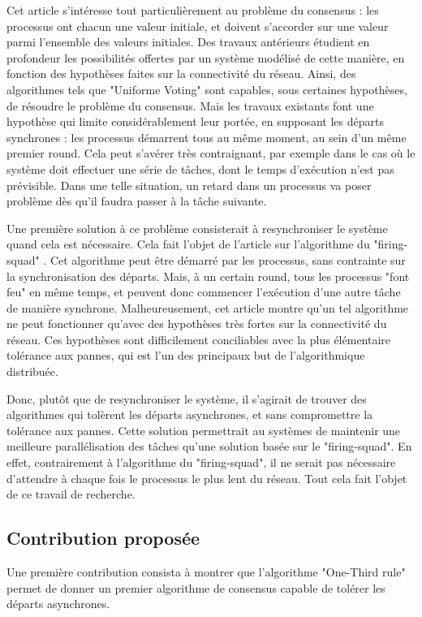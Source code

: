 \documentclass{article}
\begin{document}
Cet article s'intéresse tout particulièrement au problème du consensus : les processus ont chacun une valeur initiale, et doivent s'accorder sur une valeur parmi l'ensemble des valeurs initiales.
Des travaux antérieurs étudient en profondeur les possibilités offertes par un système modélisé de cette manière, en fonction des hypothèses faites sur la connectivité du réseau.
Ainsi, des algorithmes tels que "Uniforme Voting" sont capables, sous certaines hypothèses, de résoudre le problème du consensus.
Mais les travaux existants font une hypothèse qui limite considérablement leur portée, en supposant les départs synchrones : les processus démarrent tous au même moment, au sein d'un même premier round.
Cela peut s'avérer très contraignant, par exemple dans le cas où le système doit effectuer une série de tâches, dont le temps d'exécution n'est pas prévisible.
Dans une telle situation, un retard dans un processus va poser problème dès qu'il faudra passer à la tâche suivante.

Une première solution à ce problème consisterait à resynchroniser le système quand cela est nécessaire. Cela fait l'objet de l'article sur l'algorithme du "firing-squad" \cite{firing_squad}.
Cet algorithme peut être démarré par les processus, sans contrainte sur la synchronisation des départs. Mais, à un certain round, tous les processus "font feu" en même temps, et
peuvent donc commencer l'exécution d'une autre tâche de manière synchrone.
Malheureusement, cet article montre qu'un tel algorithme ne peut fonctionner qu'avec des hypothèses très fortes sur la connectivité du réseau.
Ces hypothèses sont difficilement conciliables avec la plus élémentaire tolérance aux pannes, qui est l'un des principaux but de l'algorithmique distribuée.

Donc, plutôt que de resynchroniser le système, il s'agirait de trouver des algorithmes qui tolèrent les départs asynchrones, et sans compromettre la tolérance aux pannes.
Cette solution permettrait au systèmes de maintenir une meilleure parallélisation des tâches qu'une solution basée sur le "firing-squad".
En effet, contrairement à l'algorithme du "firing-squad", il ne serait pas nécessaire d'attendre à chaque fois le processus le plus lent du réseau.
Tout cela fait l'objet de ce travail de recherche.

\subsection{Contribution proposée}

Une première contribution consista à montrer que l'algorithme "One-Third rule" permet de donner un premier algorithme de consensus capable de tolérer les départs asynchrones.
\end{document}
